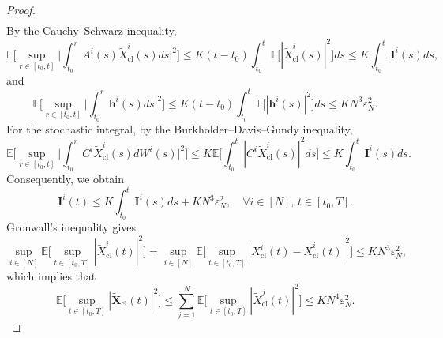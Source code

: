 \documentclass[10pt,a4paper]{amsart}
\newcommand{\cl}{\mathrm{cl}}
\def\wt{\widetilde}
\begin{document}
\begin{proof}
\begin{equation*}
\begin{aligned}
\end{aligned}
\end{equation*}
By the Cauchy--Schwarz inequality, 
$$\mathbb{E} \Big[\sup_{r \in [t_0,t]} \Big|\int_{t_0}^r A^i(s) \wt{X}^i_{\cl}(s) ds\Big|^2 \Big] \leq K(t - t_0) \int_{t_0}^t \mathbb{E}\big[|\wt{X}^i_{\cl}(s)|^2 \big] ds \leq K \int_{t_0}^t \bm{I}^i(s)ds,$$
and
\begin{equation*}
\mathbb{E} \Big[\sup_{r \in [t_0,t]} \Big|\int_{t_0}^r \bm{h}^i(s) ds\Big|^2 \Big] \leq K(t - t_0) \int_{t_0}^t \mathbb{E}\big[|\bm{h}^i(s)|^2 \big] ds \leq KN^3 \varepsilon_N^2.
\end{equation*}
For the stochastic integral, by the Burkholder--Davis--Gundy inequality,
\begin{equation*}
\mathbb{E} \Big[\sup_{r \in [t_0,t]} \Big|\int_{t_0}^r C^i \wt{X}^i_{\cl}(s) dW^i(s) \Big|^2 \Big] \leq K \mathbb{E} \Big[\int_{t_0}^t |C^i \wt{X}^i_{\cl}(s)|^2 ds \Big] \leq K \int_{t_0}^t \bm{I}^i(s) ds. 
\end{equation*}
Consequently, we obtain
$$\bm{I}^i(t) \leq K \int_{t_0}^t \bm{I}^i(s) ds + KN^3 \varepsilon_N^2, \quad \forall i \in [N], \, t \in [t_0, T].$$
Gronwall's inequality gives
$$\sup_{i \in [N]} \mathbb{E}\Big[\sup_{t \in[t_0,T]} |\wt{X}^i_{\cl}(t)|^2 \Big] = \sup_{i \in [N]} \mathbb{E}\Big[\sup_{t \in[t_0,T]} |X^i_{\cl}(t) - \bar{X}^i_{\cl}(t)|^2 \Big] \leq KN^3 \varepsilon_N^2,$$
which implies that
$$\mathbb{E} \Big[\sup_{t \in [t_0, T]}|\wt{\bm{X}}_{\cl}(t)|^2 \Big] \leq \sum_{j=1}^N  \mathbb{E} \Big[\sup_{t \in [t_0, T]} |\wt{X}^j_{\cl}(t)|^2 \Big] \leq KN^4 \varepsilon_N^2.$$


\end{proof}
\end{document}
